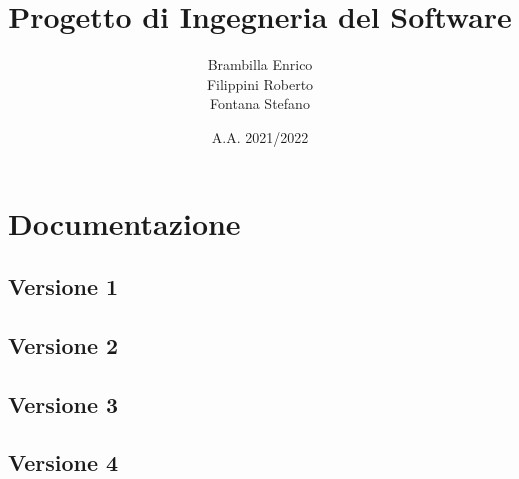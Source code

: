 \documentclass[12pt, a4paper, oneside]{book}
\title{Progetto di Ingegneria del Software}
\author{Brambilla Enrico\\Filippini Roberto\\Fontana Stefano}
\date{A.A. 2021/2022}
\begin{document}
\maketitle
\cleardoublepage
{}
\tableofcontents
\cleardoublepage






\chapter{Documentazione}
\section{Versione 1}


\pagebreak
\section{Versione 2}


\pagebreak
\section{Versione 3}


\pagebreak
\section{Versione 4}


\cleardoublepage
{}
\listoffigures
\end{document}
